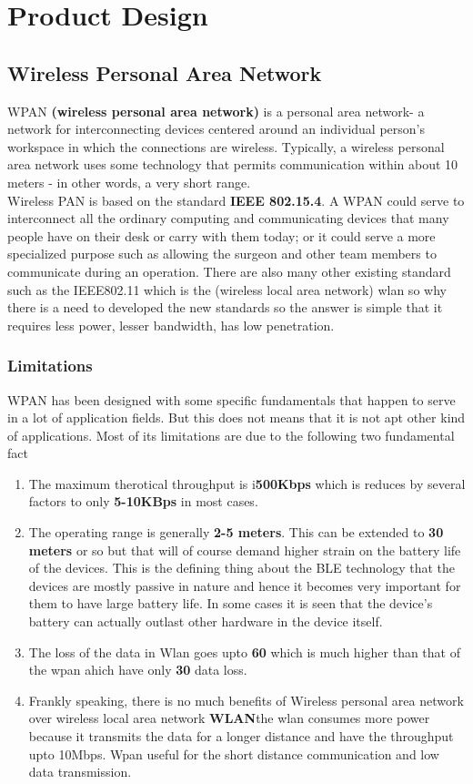 \chapter{Product Design}
\section{Wireless Personal Area Network}
WPAN \textbf{(wireless personal area network)} is a personal area network- a network for interconnecting devices centered around an individual person's workspace in which the connections are wireless. Typically, a wireless personal area network uses some technology that permits communication within about 10 meters - in other words, a very short range.\\
Wireless PAN is based on the standard \textbf{IEEE 802.15.4}. A WPAN could serve to interconnect all the ordinary computing and communicating devices that many people have on their desk or carry with them today; or it could serve a more specialized purpose such as allowing the surgeon and other team members to communicate during an operation. There are also many other existing standard such as the IEEE802.11 which is the (wireless local area network) wlan so why there is a need to developed the new standards so the answer is simple that it requires less power, lesser  bandwidth, has low penetration.
\subsection{Limitations}
WPAN has been designed with some specific fundamentals that happen to serve in a lot of application fields. But this does not means  that it is not apt other kind of applications. Most of its limitations are due to the following two fundamental fact
\begin{enumerate}
	\item The maximum therotical throughput is i\textbf{500Kbps} which is reduces by several factors to only \textbf{5-10KBps} in most cases.
	\item The operating range is generally \textbf{2-5 meters}. This can be extended to \textbf{30 meters} or so but that will of course demand higher strain on the battery life of the devices. This is the defining thing about the BLE technology that the devices are mostly passive in nature and hence it becomes very important for them to have large battery life. In some cases it is seen that the device’s battery can actually outlast other hardware in the device itself.
	\item The loss of the data in Wlan goes upto \textbf{60} which is much higher than that of the wpan ahich have only \textbf{30} data loss.
	\item Frankly speaking, there is no much benefits of Wireless personal area network over wireless local area network \textbf{WLAN}the wlan consumes more power because it transmits the data for a longer distance and have the throughput upto 10Mbps. Wpan useful for the short distance communication and low data transmission.
\end{enumerate}
